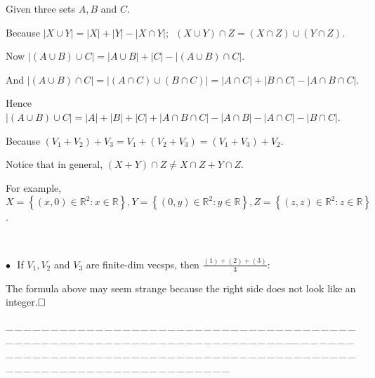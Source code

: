 \documentclass[a4paper, 11pt, UTF8]{article}
\def\Rbb{{\mathbb{R}}}
\def\BulletPoint{{\small$\bullet$}}
\def\ProblemEnding{{\tiny \_\,\_\,\_\,\_\,\_\,\_\,\_\,\_\,\_\,\_\,\_\,\_\,\_\,\_\,\_\,\_\,\_\,\_\,\_\,\_\,\_\,\_\,\_\,\_\,\_\,\_\,\_\,\_\,\_\,\_\,\_\,\_\,\_\,\_\,\_\,\_\,\_\,\_\,\_\,\_\,\_\,\_\,\_\,\_\,\_\,\_\,\_\,\_\,\_\,\_\,\_\,\_\,\_\,\_\,\_\,\_\,\_\,\_\,\_\,\_\,\_\,\_\,\_\,\_\,\_\,\_\,\_\,\_\,\_\,\_\,\_\_\,\_\,\_\,\_\,\_\,\_\,\_\,\_\,\_\,\_\,\_\,\_\,\_\,\_\,\_\,\_\,\_\,\_\,\_\,\_\,\_\,\_\,\_\,\_\,\_\,\_\,\_\,\_\,\_\,\_\,\_\,\_\,\_\,\_\,\_\,\_\,\_\,\_\,\_\,\_\,\_\,\_\,\_\,\_\,\_\,\_\,\_\,\_\,\_\,\_\,\_\,\_\,\_\,\_\,\_\,\_\,\_\,\_\,\_\,\_\,\_\,\_\,\_\,\_\,\_\,\_\,\_\,\_\,\_\,\_\,\_}}
\def\ChapterEnding{\rightline{\timesbfx\Large{E{\small NDED}}}\par\vspace{6pt}}
\begin{document}
\begin{large}
\par{} Given three sets $A,B$ and $C$.\par\quad
Because $\left|X\cup Y\right|=\left|X\right|+\left|Y\right|-\left|X\cap Y\right|;\,\,\,(X\cup Y)\cap Z=(X\cap Z)\cup(Y\cap Z)$.\par\quad
Now $\left|(A\cup B)\cup C\right|=\left|A\cup B\right|+\left|C\right|-\left|(A\cup B)\cap C\right|.$\par\quad
And $\left|(A\cup B)\cap C\right|=\left|(A\cap C)\cup(B\cap C)\right|=\left|A\cap C\right|+\left|B\cap C\right|-\left|A\cap B\cap C\right|.$\par\quad
Hence $\left|(A\cup B)\cup C\right|=\left| A\right|+\left| B\right|+\left| C\right|+\left| A\cap B\cap C\right|-\left| A\cap B\right|-\left| A\cap C\right|-\left| B\cap C\right|.$\par\vspace{12pt}\quad
Because $(V_1+V_2)+V_3=V_1+(V_2+V_3)=(V_1+V_3)+V_2$.\par\quad
{}\par\quad
Notice that in general, $(X+Y)\cap Z\neq X\cap Z+Y\cap Z$.\par\quad
For example, $X=\left\{(x,0)\in\Rbb^2:x\in\Rbb\right\},Y=\left\{(0,y)\in\Rbb^2:y\in\Rbb\right\},Z=\left\{(z,z)\in\Rbb^2:z\in\Rbb\right\}$.\par
{\,}\par
\BulletPoint \,\Corollary \,\,\,{\timessl\Large If $V_1,V_2$ and $V_3$ are finite-dim vecsps, then} {\small $\displaystyle\frac{(1)+(2)+(3)}{3}:$
}\par
{}\par\quad
{\timessl The formula above may seem strange because the right side does not look like an integer.$\hfill\square$}\par
\ProblemEnding\par
\ChapterEnding


\end{large}
\end{document}
